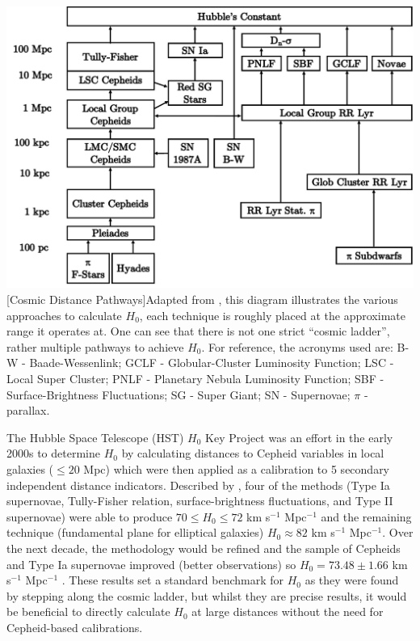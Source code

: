 \documentclass[12pt, onecolumn]{revtex4}    %
\begin{document}
\begin{center}
\includegraphics[width=0.8\linewidth]{figures/cosmic_distance_pathways}
[Cosmic Distance Pathways]{Adapted from \cite{jacoby_extragal}, this diagram illustrates the various approaches to calculate $H_0$, each technique is roughly placed at the approximate range it operates at. One can see that there is not one strict ``cosmic ladder'', rather multiple pathways to achieve $H_0$. For reference, the acronyms used are: B-W - Baade-Wessenlink; GCLF - Globular-Cluster Luminosity Function; LSC - Local Super Cluster; PNLF - Planetary Nebula Luminosity Function; SBF - Surface-Brightness Fluctuations; SG - Super Giant; SN - Supernovae; $\pi$ - parallax.}
\label{fig:cosmic_pathways}
\end{center}

The Hubble Space Telescope (HST) $H_0$ Key Project was an effort in the early 2000s to determine $H_0$ by calculating distances to Cepheid variables in local galaxies ($\le 20$ Mpc) which were then applied as a calibration to 5 secondary independent distance indicators. Described by \cite{freedman_hstkeystone}, four of the methods (Type Ia supernovae, Tully-Fisher relation, surface-brightness fluctuations, and Type II supernovae) were able to produce $70\le H_0 \le72$ km s$^{-1}$ Mpc$^{-1}$ and the remaining technique (fundamental plane for elliptical galaxies) $H_0\approx82$ km s$^{-1}$ Mpc$^{-1}$. Over the next decade, the methodology would be refined and the sample of Cepheids and Type Ia supernovae improved (better observations) so $H_0=73.48 \pm1.66$ km s$^{-1}$ Mpc$^{-1}$ \citep{2011ApJ...730..119R, 2016ApJ...826...56R, 2018ApJ...855..136R}. These results set a standard benchmark for $H_0$ as they were found by stepping along the cosmic ladder, but whilst they are precise results, it would be beneficial to directly calculate $H_0$ at large distances without the need for Cepheid-based calibrations. \\
\end{document}

